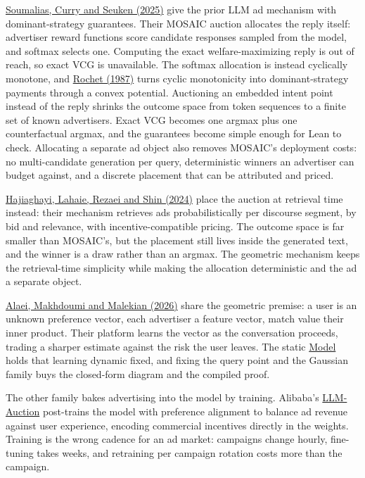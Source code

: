 \href{https://arxiv.org/abs/2405.05905}{Soumalias, Curry and Seuken
(2025)} give the prior LLM ad mechanism with dominant-strategy
guarantees. Their MOSAIC auction allocates the reply itself: advertiser
reward functions score candidate responses sampled from the model, and
softmax selects one. Computing the exact welfare-maximizing reply is out
of reach, so exact VCG is unavailable. The softmax allocation is instead
cyclically monotone, and
\href{https://doi.org/10.1016/0304-4068(87)90007-3}{Rochet (1987)} turns
cyclic monotonicity into dominant-strategy payments through a convex
potential. Auctioning an embedded intent point instead of the reply
shrinks the outcome space from token sequences to a finite set of known
advertisers. Exact VCG becomes one argmax plus one counterfactual
argmax, and the guarantees become simple enough for Lean to check.
Allocating a separate ad object also removes MOSAIC's deployment costs:
no multi-candidate generation per query, deterministic winners an
advertiser can budget against, and a discrete placement that can be
attributed and priced.

\href{https://arxiv.org/abs/2406.09459}{Hajiaghayi, Lahaie, Rezaei and
Shin (2024)} place the auction at retrieval time instead: their
mechanism retrieves ads probabilistically per discourse segment, by bid
and relevance, with incentive-compatible pricing. The outcome space is
far smaller than MOSAIC's, but the placement still lives inside the
generated text, and the winner is a draw rather than an argmax. The
geometric mechanism keeps the retrieval-time simplicity while making the
allocation deterministic and the ad a separate object.

\href{https://papers.ssrn.com/sol3/papers.cfm?abstract_id=6212838}{Alaei,
Makhdoumi and Malekian (2026)} share the geometric premise: a user is an
unknown preference vector, each advertiser a feature vector, match value
their inner product. Their platform learns the vector as the
conversation proceeds, trading a sharper estimate against the risk the
user leaves. The static \hyperref[model]{Model} holds that learning
dynamic fixed, and fixing the query point and the Gaussian family buys
the closed-form diagram and the compiled proof.

The other family bakes advertising into the model by training. Alibaba's
\href{https://arxiv.org/abs/2512.10551}{LLM-Auction} post-trains the
model with preference alignment to balance ad revenue against user
experience, encoding commercial incentives directly in the weights.
Training is the wrong cadence for an ad market: campaigns change hourly,
fine-tuning takes weeks, and retraining per campaign rotation costs more
than the campaign.

